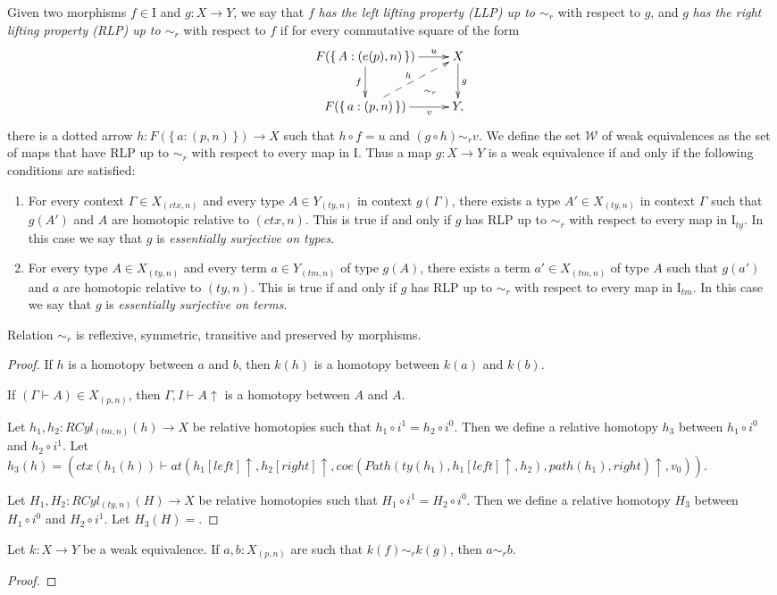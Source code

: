 \documentclass[reqno]{amsart}
\theoremstyle{definition}
\theoremstyle{remark}
\newcommand{\we}{\mathcal{W}}
\newcommand{\I}{\mathrm{I}}
\numberwithin{figure}{section}
\begin{document}
Given two morphisms $f \in \I$ and $g : X \to Y$, we say that $f$ \emph{has the left lifting property (LLP) up to $\sim_r$} with respect to $g$,
and $g$ \emph{has the right lifting property (RLP) up to $\sim_r$} with respect to $f$ if for every commutative square of the form
\[ \xymatrix{ F(\{\,A : (e(p),n)\,\}) \ar[r]^-u \ar@{}[dr]|(.7){\sim_r} \ar[d]_f & X \ar[d]^g \\
              F(\{\,a : (p,n)\,\}) \ar[r]_-v \ar@{-->}[ur]^h                     & Y,
            } \]
there is a dotted arrow $h : F(\{\,a : (p,n)\,\}) \to X$ such that $h \circ f = u$ and $(g \circ h) \sim_r v$.
We define the set $\we$ of weak equivalences as the set of maps that have RLP up to $\sim_r$ with respect to every map in $\I$.
Thus a map $g : X \to Y$ is a weak equivalence if and only if the following conditions are satisfied:
\begin{enumerate}
\item For every context $\Gamma \in X_{(ctx,n)}$ and every type $A \in Y_{(ty,n)}$ in context $g(\Gamma)$, there exists a type $A' \in X_{(ty,n)}$ in context $\Gamma$ such that $g(A')$ and $A$ are homotopic relative to $(ctx,n)$.
    This is true if and only if $g$ has RLP up to $\sim_r$ with respect to every map in $\I_{ty}$.
    In this case we say that $g$ is \emph{essentially surjective on types}.
\item For every type $A \in X_{(ty,n)}$ and every term $a \in Y_{(tm,n)}$ of type $g(A)$, there exists a term $a' \in X_{(tm,n)}$ of type $A$ such that $g(a')$ and $a$ are homotopic relative to $(ty,n)$.
    This is true if and only if $g$ has RLP up to $\sim_r$ with respect to every map in $\I_{tm}$.
    In this case we say that $g$ is \emph{essentially surjective on terms}.
\end{enumerate}

\begin{prop}
Relation $\sim_r$ is reflexive, symmetric, transitive and preserved by morphisms.
\end{prop}
\begin{proof}
If $h$ is a homotopy between $a$ and $b$, then $k(h)$ is a homotopy between $k(a)$ and $k(b)$.

If $(\Gamma \vdash A) \in X_{(p,n)}$, then $\Gamma, I \vdash A\!\uparrow$ is a homotopy between $A$ and $A$.

Let $h_1, h_2 : RCyl_{(tm,n)}(h) \to X$ be relative homotopies such that $h_1 \circ i^1 = h_2 \circ i^0$.
Then we define a relative homotopy $h_3$ between $h_1 \circ i^0$ and $h_2 \circ i^1$.
Let $h_3(h) = (ctx(h_1(h)) \vdash at(h_1[left]\!\uparrow, h_2[right]\!\uparrow, coe(Path(ty(h_1), h_1[left]\!\uparrow, h_2), path(h_1), right)\!\uparrow, v_0))$.

Let $H_1, H_2 : RCyl_{(ty,n)}(H) \to X$ be relative homotopies such that $H_1 \circ i^1 = H_2 \circ i^0$.
Then we define a relative homotopy $H_3$ between $H_1 \circ i^0$ and $H_2 \circ i^1$.
Let $H_3(H) = $.
\end{proof}

\begin{lem}
Let $k : X \to Y$ be a weak equivalence.
If $a,b : X_{(p,n)}$ are such that $k(f) \sim_r k(g)$, then $a \sim_r b$.
\end{lem}
\begin{proof}
\end{proof}



\end{document}
